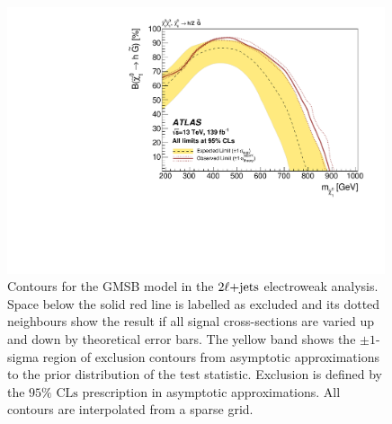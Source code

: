 \begin{figure}[tp]
\centering
\includegraphics[width=0.99\textwidth]{figures/2ljets_contours_gmsb.pdf}
\caption{%
Contours for the GMSB model in the $2\ell\mathrm{+jets}$ electroweak analysis.
Space below the solid red line is labelled as excluded and its dotted
neighbours show the result if all signal cross-sections are varied up and down
by theoretical error bars.
The yellow band shows the $\pm1$-sigma region of exclusion contours
from asymptotic approximations to the prior distribution of the test statistic.
Exclusion is defined by the $95\%$ $\mathrm{CLs}$ prescription
in asymptotic approximations.
All contours are interpolated from a sparse grid.
}
\label{fig:2ljets_contours_gmsb}
\end{figure}


